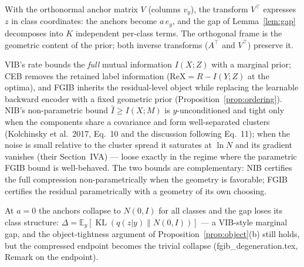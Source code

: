 \begin{remark}\label{rem:frame}
With the orthonormal anchor matrix $V$ (columns $v_y$), the transform $V^{\top}$ expresses
$z$ in class coordinates: the anchors become $a\,e_y$, and the gap of
Lemma~\ref{lem:gap} decomposes into $K$ independent per-class terms. The orthogonal frame
is the geometric content of the prior; both inverse transforms ($A^{\top}$ and $V^{\top}$)
preserve it.
\end{remark}

\begin{remark}\label{rem:position}
VIB's rate bounds the \emph{full} mutual information $I(X;Z)$ with a marginal prior;
CEB removes the retained label information ($\mathrm{ReX} = R - I(Y;Z)$ at the optima),
and FGIB inherits the residual-level object while replacing the learnable backward
encoder with a fixed geometric prior (Proposition~\ref{prop:ordering}).
NIB's non-parametric bound $\widehat I \ge I(X;M)$ is $y$-unconditioned and tight only
when the components share a covariance and form well-separated clusters (Kolchinsky et
al.\ 2017, Eq.~10 and the discussion following Eq.~11); when the noise is small relative
to the cluster spread it saturates at $\ln N$ and its gradient vanishes (their
Section~IVA) --- loose exactly in the regime where the parametric FGIB bound is
well-behaved. The two bounds are complementary: NIB certifies the full compression
non-parametrically when the geometry is favorable; FGIB certifies the residual
parametrically with a geometry of its own choosing.
\end{remark}

\begin{remark}\label{rem:a0}
At $a = 0$ the anchors collapse to $N(0, I)$ for all classes and the gap loses its class
structure: $\Delta = \mathbb{E}_y[\operatorname{KL}(q(z|y)\|N(0,I))]$ --- a VIB-style
marginal gap, and the object-tightness argument of
Proposition~\ref{prop:object}(b) still holds, but the compressed endpoint becomes the
trivial collapse (fgib\_degeneration.tex, Remark on the endpoint).
\end{remark}
